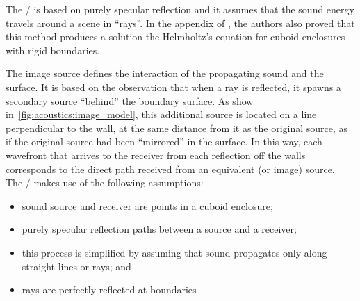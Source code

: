 The \ISM/ is based on purely specular reflection and it assumes that the sound energy travels around a scene in ``rays''.
In the appendix of , the authors also proved that this method produces a solution the Helmholtz's equation
for cuboid enclosures with rigid boundaries.

\mynewline
The image source defines the interaction of the propagating sound and the surface.
It is based on the observation that when a ray is reflected, it spawns a secondary source ``behind'' the boundary surface.
As show in~\cref{fig:acoustics:image_model}, this additional source is located on a line perpendicular to the wall, at the same distance from it as the original source, as if the original source had been “mirrored” in the surface.
In this way, each wavefront that arrives to the receiver from each reflection off the walls corresponds to the direct path received from an equivalent (or image) source.
\\The \ISM/ makes use of the following assumptions:
\begin{itemize}
    \item sound source and receiver are points in a cuboid enclosure;
    \item purely specular reflection paths between a source and a receiver;
    \item this process is simplified by assuming that sound propagates only along straight lines or rays; and
    \item rays are perfectly reflected at boundaries
\end{itemize}



